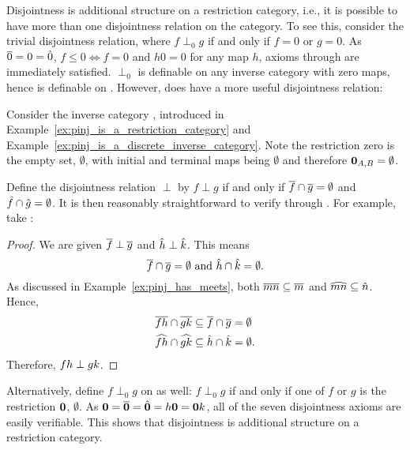 Disjointness is additional structure on a restriction category, i.e., it is possible to have more
than one disjointness relation on the category. To see this, consider the trivial disjointness
relation, where $f \perp_0 g$ if and only if $f = 0$ or $g = 0$. As $\overline{0} = 0 = \hat{0}$, $f \le 0
\iff f = 0$ and $h 0 =0$ for any map $h$, axioms  through  are
immediately satisfied. $\perp_0$ is definable on any inverse category with zero maps, hence is
definable on \pinj. However, \pinj does have a more useful disjointness relation:
\begin{example}\label{ex:pinj_has_a_disjointness_relation}
  Consider the inverse category \pinj, introduced in Example~\ref{ex:pinj_is_a_restriction_category}
  and Example~\ref{ex:pinj_is_a_discrete_inverse_category}.
  Note the restriction zero is the empty set, $\emptyset$, with initial and terminal maps being
  $\emptyset$ and therefore $\mathbf{0}_{A,B} = \emptyset$.

  Define the disjointness relation $\perp$ by $f \perp g$ if and only if
  $\overline{f}\cap\overline{g}=\emptyset$ and $\hat{f}\cap\hat{g} = \emptyset$. It is then
  reasonably straightforward to verify  through . For example, take
  :
  \begin{proof}
    We are given $\overline{f}\perp\overline{g}$ and $\hat{h}\perp\hat{k}$. This means
    \[
      \overline{f}\cap\overline{g}=\emptyset \text{ and }\hat{h}\cap\hat{k} = \emptyset.
    \]
    As discussed in Example~\ref{ex:pinj_has_meets}, both
    $\overline{m n} \subseteq \overline{m}$ and  $\widehat{m n} \subseteq \hat{n}$. Hence,
    \begin{align*}
      \overline{f h}\cap\overline{g k}&\subseteq \overline{f}\cap \overline{g}= \emptyset\\
      \widehat{f h}\cap\widehat{g k}&\subseteq \hat{h}\cap \hat{k}= \emptyset.
    \end{align*}
    Therefore, $f h \perp g k$.
  \end{proof}

  Alternatively, define $f \perp_0 g$ on \pinj as well: $f \perp_0 g$ if and only if one of $f$
  or $g$ is the restriction $\mathbf{0}$, $\emptyset$. As $\mathbf{0} = \overline{\mathbf{0}} = \hat{\mathbf{0}} = h
  \mathbf{0} = \mathbf{0} k$, all of the seven disjointness axioms are easily verifiable. This shows that
  disjointness is additional structure on a restriction category.
\end{example}

